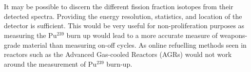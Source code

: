 \\\\It may be possible to discern the different fission fraction isotopes from their detected spectra. Providing the energy resolution, statistics, and location of the detector is sufficient. This would be very useful for non-proliferation purposes as measuring the Pu$^{239}$ burn up would lead to a more accurate measure of weapons-grade material than measuring on-off cycles. As online refuelling methods seen in reactors such as the Advanced Gas-cooled Reactors (AGRs) would not work around the measurement of Pu$^{239}$ burn-up. 



\ifpdf
    \graphicspath{{Chapter1/Figs/Raster/}{Chapter1/Figs/PDF/}{Chapter1/Figs/}}
\else
    \graphicspath{{Chapter1/Figs/Vector/}{Chapter1/Figs/}}
\fi




